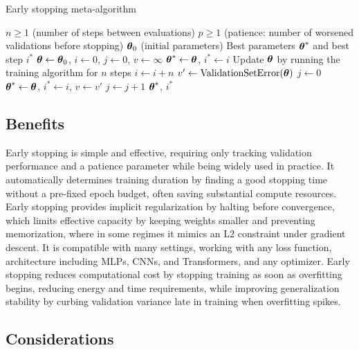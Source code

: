 \begin{algorithm}
\caption{Early stopping meta-algorithm}
\label{alg:early-stopping}
\begin{algorithmic}
\Require $n \geq 1$ (number of steps between evaluations)
\Require $p \geq 1$ (patience: number of worsened validations before stopping)
\Require $\boldsymbol{\theta}_0$ (initial parameters)
\Ensure Best parameters $\boldsymbol{\theta}^*$ and best step $i^*$
\State $\boldsymbol{\theta} \gets \boldsymbol{\theta}_0$, $i \gets 0$, $j \gets 0$, $v \gets \infty$
\State $\boldsymbol{\theta}^* \gets \boldsymbol{\theta}$, $i^* \gets i$
    \State Update $\boldsymbol{\theta}$ by running the training algorithm for $n$ steps
    \State $i \gets i + n$
    \State $v' \gets \text{ValidationSetError}(\boldsymbol{\theta})$
        \State $j \gets 0$
        \State $\boldsymbol{\theta}^* \gets \boldsymbol{\theta}$, $i^* \gets i$, $v \gets v'$
    \Else
        \State $j \gets j + 1$
    \EndIf
\EndWhile
\State \Return $\boldsymbol{\theta}^*$, $i^*$
\end{algorithmic}
\end{algorithm}

\subsection{Benefits}

Early stopping is simple and effective, requiring only tracking validation performance and a patience parameter while being widely used in practice. It automatically determines training duration by finding a good stopping time without a pre-fixed epoch budget, often saving substantial compute resources. Early stopping provides implicit regularization by halting before convergence, which limits effective capacity by keeping weights smaller and preventing memorization, where in some regimes it mimics an L2 constraint under gradient descent. It is compatible with many settings, working with any loss function, architecture including MLPs, CNNs, and Transformers, and any optimizer. Early stopping reduces computational cost by stopping training as soon as overfitting begins, reducing energy and time requirements, while improving generalization stability by curbing validation variance late in training when overfitting spikes.

\subsection{Considerations}

